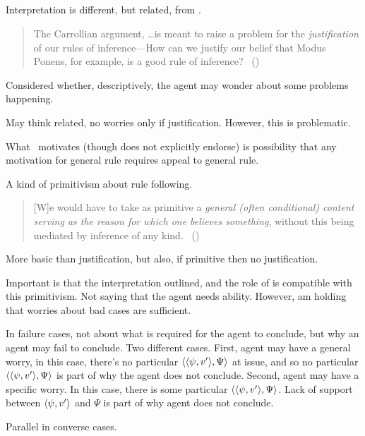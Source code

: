\subsection{\textcite{Boghossian:2008vf}}

\begin{note}
  Interpretation is different, but related, from \textcite{Boghossian:2008vf}.

  \begin{quote}
    The Carrollian argument, \dots is meant to raise a problem for the \emph{justification} of our rules of inference---How can we justify our belief that Modus Ponens, for example, is a good rule of inference?\newline
    \mbox{ }\hfill\mbox{(\citeyear[493]{Boghossian:2008vf})}
  \end{quote}

  Considered whether, descriptively, the agent may wonder about some problems happening.

  May think related, no worries only if justification.
  However, this is problematic.

  What~\textcite{Boghossian:2008vf} motivates (though does not explicitly endorse) is possibility that any motivation for general rule requires appeal to general rule.

  A kind of primitivism about rule following.
  \begin{quote}
    [W]e would have to take as primitive a \emph{general (often conditional) content serving as the reason for which one believes something}, without this being mediated by inference of any kind.%
    \mbox{ }\hfill\mbox{(\citeyear[500]{Boghossian:2008vf})}
  \end{quote}

  More basic than justification, but also, if primitive then no justification.

  Important is that the interpretation outlined, and the role of \qzS{} is compatible with this primitivism.
  Not saying that the agent needs \abspec{} ability.
  However, am holding that worries about bad cases are sufficient.

  In failure cases, not about what is required for the agent to conclude, but why an agent may fail to conclude.
  Two different cases.
  First, agent may have a general worry, in this case, there's no particular \(\langle \langle \psi, v' \rangle, \Psi \rangle\) at issue, and so no particular \(\langle \langle \psi, v' \rangle, \Psi \rangle\) is part of why the agent does not conclude.
  Second, agent may have a specific worry.
  In this case, there is some particular \(\langle \langle \psi, v' \rangle, \Psi \rangle\).
  Lack of support between \(\langle \psi, v' \rangle\) and \(\Psi\) is part of why agent does not conclude.

  Parallel in converse cases.
\end{note}

